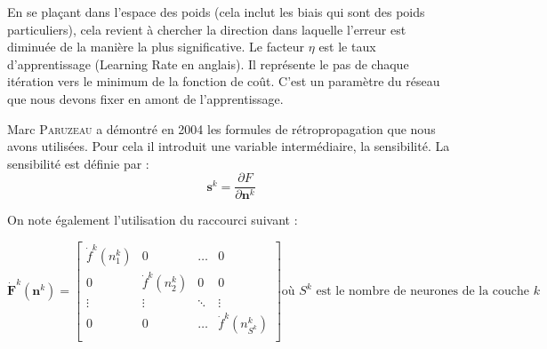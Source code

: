 En se plaçant dans l'espace des poids (cela inclut les biais qui sont des poids particuliers), cela revient à chercher la direction dans laquelle l'erreur est diminuée de la manière la plus significative. Le facteur $\eta$ est le taux d'apprentissage (Learning Rate en anglais). Il représente le pas de chaque itération vers le minimum de la fonction de coût. C'est un paramètre du réseau que nous devons fixer en amont de l'apprentissage.

Marc \textsc{Paruzeau} a démontré en 2004 les formules de rétropropagation que nous avons utilisées. Pour cela il introduit une variable intermédiaire, la sensibilité. La sensibilité est définie par :
\begin{equation}
 \mathbf{s}^k = \frac{\partial F}{\partial \mathbf{n}^k}
\end{equation}

On note également l'utilisation du raccourci suivant : 

\begin{equation}
  \displaystyle
 \mathbf{\dot F}^k\left(\mathbf{n}^k\right) =
 \begin{bmatrix}
  \dot f ^k\left(n^k_1\right) & 0 & \ldots & 0\\
  0 & \dot f^k\left(n^k_2\right) & 0 & 0\\
  \vdots & \vdots & \ddots & \vdots \\
  0 & 0 & \ldots & \dot f^k\left(n^k_{S^k}\right)\\
 \end{bmatrix}
 \text{où $S^k$ est le nombre de neurones de la couche $k$}
\end{equation}

